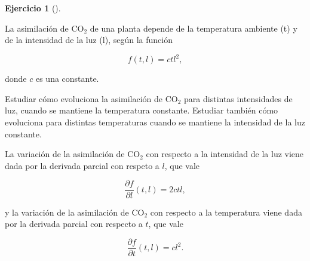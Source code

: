 \documentclass[
  a4paper,
]{scrreport}
\theoremstyle{definition}
\newtheorem{exercise}{Ejercicio}[chapter]
\theoremstyle{remark}
\begin{document}
\begin{exercise}[]\protect\hypertarget{exr-co2-planta}{}\label{exr-co2-planta}

La asimilación de CO\(_2\) de una planta depende de la temperatura
ambiente (t) y de la intensidad de la luz (l), según la función

\[
f(t,l) = ctl^2,
\]

donde \(c\) es una constante.

Estudiar cómo evoluciona la asimilación de CO\(_2\) para distintas
intensidades de luz, cuando se mantiene la temperatura constante.
Estudiar también cómo evoluciona para distintas temperaturas cuando se
mantiene la intensidad de la luz constante.

\end{exercise}

\begin{tcolorbox}[enhanced jigsaw, left=2mm, coltitle=black, colbacktitle=quarto-callout-tip-color!10!white, opacitybacktitle=0.6, colback=white, breakable, titlerule=0mm, toptitle=1mm, rightrule=.15mm, bottomtitle=1mm, bottomrule=.15mm, toprule=.15mm, leftrule=.75mm, arc=.35mm, opacityback=0, title=\textcolor{quarto-callout-tip-color}{\faLightbulb}\hspace{0.5em}{Solución}, colframe=quarto-callout-tip-color-frame]

La variación de la asimilación de CO\(_2\) con respecto a la intensidad
de la luz viene dada por la derivada parcial con respeto a \(l\), que
vale

\[
\frac{\partial f}{\partial l}(t,l) = 2ctl,
\]

y la variación de la asimilación de CO\(_2\) con respecto a la
temperatura viene dada por la derivada parcial con respecto a \(t\), que
vale

\[
\frac{\partial f}{\partial t}(t,l) = cl^2.
\]

\end{tcolorbox}
\end{document}
